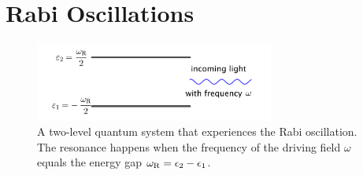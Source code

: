 


\section{\label{chap:app-sec:rabi-oscillations}Rabi Oscillations}

\begin{figure}[htbp]
    \centering
    \includegraphics[width=0.7\textwidth]{chapters/assets/matter/rabi-illustrative-diagram}
    \caption{A two-level quantum system that experiences the Rabi oscillation. The resonance happens when the frequency of the driving field $\omega$ equals the energy gap $\omega_\mathrm R = \epsilon_2 - \epsilon_1$.}
    \label{chap:app-sec:rabi-oscillations-fig:rabi-diagram}
\end{figure}

